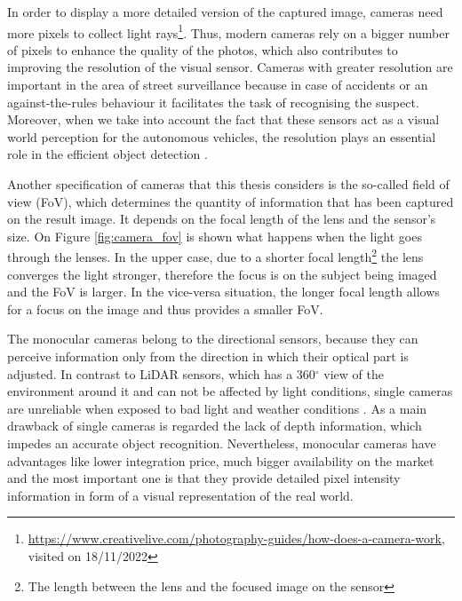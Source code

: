 \newpage
In order to display a more detailed version of the captured image, cameras need more pixels to collect light rays\footnote{\url{https://www.creativelive.com/photography-guides/how-does-a-camera-work}, visited on 18/11/2022}. Thus, modern cameras rely on a bigger number of pixels to enhance the quality of the photos, which also contributes to improving the resolution of the visual sensor. Cameras with greater resolution are important in the area of street surveillance because in case of accidents or an against-the-rules behaviour it facilitates the task of recognising the suspect. Moreover, when we take into account the fact that these sensors act as a visual world perception for the autonomous vehicles, the resolution plays an essential role in the efficient object detection \cite{resolution_importance}. 

Another specification of cameras that this thesis considers is the so-called field of view (FoV), which determines the quantity of information that has been captured on the result image. It depends on the focal length of the lens and the sensor's size. On Figure \ref{fig:camera_fov} is shown what happens when the light goes through the lenses. In the upper case, due to a shorter focal length\footnote{The length between the lens and the focused image on the sensor} the lens converges the light stronger, therefore the focus is on the subject being imaged and the FoV is larger. In the vice-versa situation, the longer focal length allows for a focus on the image and thus provides a smaller FoV.

The monocular cameras belong to the directional sensors, because they can perceive information only from the direction in which their optical part is adjusted. In contrast to LiDAR sensors, which has a 360$^{\circ}$ view of the environment around it and can not be affected by light
conditions, single cameras are unreliable when exposed to bad light and weather conditions \cite{camera_vs_lidar}. As a main drawback of single cameras is regarded the lack of depth information, which impedes an accurate object recognition. Nevertheless, monocular cameras have advantages like lower integration price, much bigger availability on the market and the most important one is that they provide detailed pixel intensity information in form of a visual representation of the real world.

